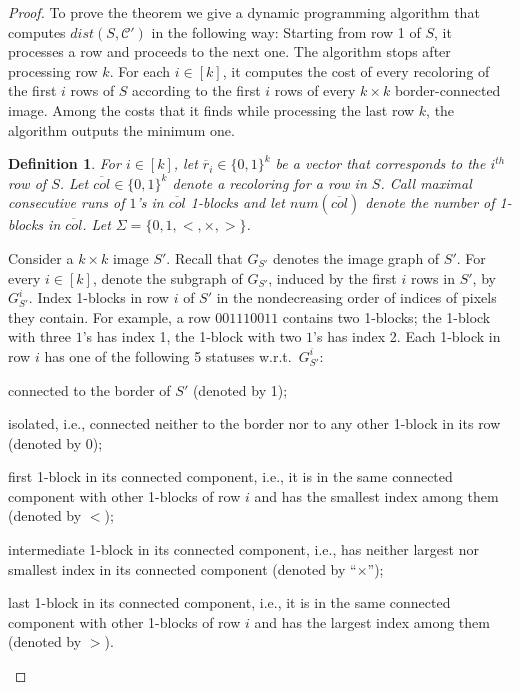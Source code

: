 \documentclass[11pt,english]{article}
\renewenvironment{itemize}[1]{\begin{compactitem}#1}{\end{compactitem}}
\newtheorem{definition}{Definition}[section]
\numberwithin{figure}{section}
\newcommand{\C}{{\mathcal C}}
\newcommand{\dis}{dist}
\begin{document}
\begin{proof}
To prove the theorem we give a dynamic programming algorithm that computes $\dis(S,\C')$ in the following way: Starting from row 1 of $S$, it processes a row and proceeds to the next one. The algorithm stops after processing row $k$. For each $i\in[k]$, it computes the cost of every recoloring of the first $i$ rows of $S$ according to the first $i$ rows of every $k\times k$ border-connected image. Among the costs that it finds while processing the last row $k$, the algorithm outputs the minimum one.

\begin{definition}
\label{def:block}
For $i\in[k]$, let $\overline{r}_{i}\in\{0,1\}^{k}$ be a vector that corresponds to the $i^{th}$ row of $S$. Let $\overline{col}\in\{0,1\}^k$ denote a recoloring for a row in $S$. Call maximal consecutive runs of $1$'s in $\overline{col}$ {\em 1-blocks} and let $num(\overline{col})$ denote the number of 1-blocks in $\overline{col}$. Let $\Sigma=\{0,1,<,\times,>\}$.
\end{definition}

Consider a $k\times k$ image $S'$. Recall that $G_{S'}$ denotes the image graph of $S'$. For every $i\in[k]$, denote the subgraph of $G_{S'}$, induced by the first $i$ rows in $S'$, by $G^i_{S'}$. Index 1-blocks in row $i$ of $S'$ in the nondecreasing order of indices of pixels they contain. For example, a row $001110011$ contains two 1-blocks; the 1-block with three $1$'s  has index 1, the 1-block with two $1$'s has index 2. Each 1-block in row $i$ has one of the following 5 statuses w.r.t.\ $G^i_{S'}$:
\begin{itemize}
\item{connected to the border of $S'$ (denoted by 1);}
\item{isolated, i.e., connected neither to the border nor to any other 1-block in its row (denoted by 0);}
\item{first 1-block in its connected component, i.e., it is in the same connected component with other 1-blocks of row $i$ and has the smallest index among them (denoted by $<$);}
\item{intermediate 1-block in its connected component, i.e., has neither largest nor smallest index in its connected component (denoted by ``$\times$'');}
\item{last 1-block in its connected component, i.e., it is in the same connected component with other 1-blocks of row $i$ and has the largest index among them (denoted by $>$).}
\end{itemize}


\end{proof}
\end{document}
